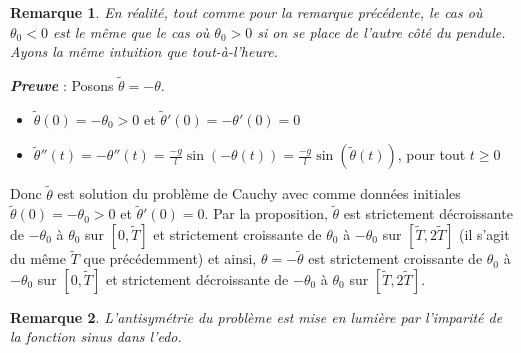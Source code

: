 \documentclass[9pt,a4paper]{article}
\newtheorem{rem}{Remarque}
\begin{document}
\begin{tcolorbox}
    \begin{rem}
        En réalité, tout comme pour la remarque précédente, le cas où $\theta_0 < 0$ est le même que le cas où $\theta_0 > 0$ si on se place de l'autre côté du pendule. Ayons la même intuition que tout-à-l'heure.
    \end{rem}
\end{tcolorbox}
\textbf{\textit{Preuve}} : Posons $\tilde{\theta} = -\theta$.
\begin{itemize}[label=\textbullet]
    \item $\tilde{\theta}(0) = -\theta_0 > 0$ et $\tilde{\theta}'(0) = -\theta'(0) = 0$
    \item $\tilde{\theta}''(t) = -\theta''(t) = \frac{-g}{l}\sin(-\theta(t)) = \frac{-g}{l}\sin(\tilde{\theta}(t))$, pour tout $t \geq 0$
\end{itemize}
 Donc $\tilde{\theta}$ est solution du problème de Cauchy avec comme données initiales $\tilde{\theta}(0) = -\theta_0 > 0$ et $\tilde{\theta}'(0) = 0$. Par la proposition, $\tilde{\theta}$ est strictement décroissante de $-\theta_0$ à $\theta_0$ sur $[0, \tilde{T}]$ et strictement croissante de $\theta_0$ à $-\theta_0$ sur $[\tilde{T}, 2\tilde{T}]$ (il s'agit du même $\tilde{T}$ que précédemment) et ainsi, $\theta = -\tilde{\theta}$ est strictement croissante de $\theta_0$ à $-\theta_0$ sur $[0, \tilde{T}]$ et strictement décroissante de $-\theta_0$ à $\theta_0$ sur $[\tilde{T}, 2\tilde{T}]$.
 \begin{tcolorbox}
     \begin{rem}
        L'antisymétrie du problème est mise en lumière par l'imparité de la fonction sinus dans l'\gls{edo}.
    \end{rem}
 \end{tcolorbox}
\end{document}
